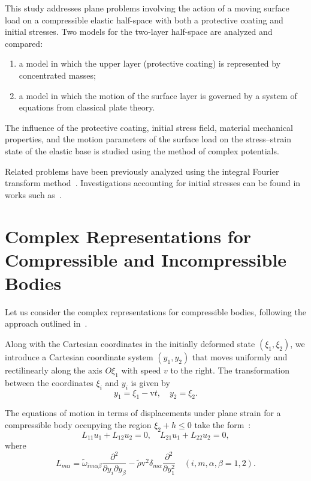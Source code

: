 This study addresses plane problems involving the action of a moving surface load on a compressible elastic half-space with both a protective coating and initial stresses. Two models for the two-layer half-space are analyzed and compared:
\begin{enumerate}
    \item a model in which the upper layer (protective coating) is represented by concentrated masses;
    \item a model in which the motion of the surface layer is governed by a system of equations from classical plate theory.
\end{enumerate}

The influence of the protective coating, initial stress field, material mechanical properties, and the motion parameters of the surface load on the stress--strain state of the elastic base is studied using the method of complex potentials.

Related problems have been previously analyzed using the integral Fourier transform method~\cite{GuzBabych2,GuzBabych10}. Investigations accounting for initial stresses can be found in works such as~\cite{GuzBabych3,GuzBabych4,GuzBabych5,GuzBabych6,GuzBabych7,GuzBabych11}.


\section{Complex Representations for Compressible and Incompressible Bodies}

Let us consider the complex representations for compressible bodies, following the approach outlined in~\cite{GuzBabych9}.

Along with the Cartesian coordinates in the initially deformed state $(\xi_{1}, \xi_{2})$, we introduce a Cartesian coordinate system $(y_{1}, y_{2})$ that moves uniformly and rectilinearly along the axis $O\xi_{1}$ with speed $v$ to the right. The transformation between the coordinates $\xi_i$ and $y_i$ is given by
\begin{equation} \label{GuzBabych_1_}
    y_{1} = \xi_{1} - \mathrm{v}t, \quad y_{2} = \xi_{2}.
\end{equation}

The equations of motion in terms of displacements under plane strain for a compressible body occupying the region $\xi_{2} + h \le 0$ take the form~\cite{GuzBabych9}:
\begin{equation} \label{GuzBabych_2_}
    L_{11} u_{1} + L_{12} u_{2} = 0, \quad L_{21} u_{1} + L_{22} u_{2} = 0,
\end{equation}
where
\begin{equation} \label{GuzBabych_3_}
    L_{m\alpha} = \tilde{\omega}_{im\alpha\beta} \frac{\partial^{2}}{\partial y_{i} \partial y_{\beta}}
    - \tilde{\rho} \mathrm{v}^{2} \delta_{m\alpha} \frac{\partial^{2}}{\partial y_{1}^{2}} \quad (i,m,\alpha,\beta = 1,2).
\end{equation}

